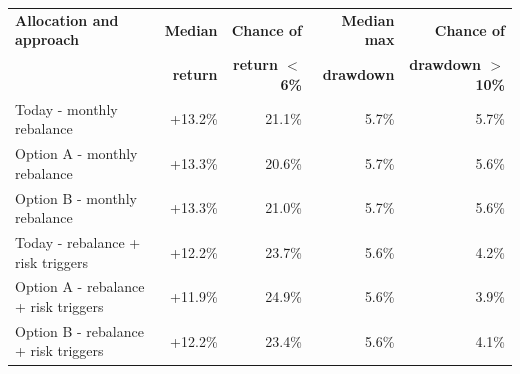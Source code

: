 \begin{tabular}{@{}lrrrr@{}}
\toprule
\textbf{Allocation and approach} & \textbf{Median} & \textbf{Chance of} & \textbf{Median max} & \textbf{Chance of} \\
 & \textbf{return} & \textbf{return $<$ 6\%} & \textbf{drawdown} & \textbf{drawdown $>$ 10\%} \\
\midrule
Today - monthly rebalance & +13.2\% & 21.1\% & \textminus{}5.7\% & 5.7\% \\
Option A - monthly rebalance & +13.3\% & 20.6\% & \textminus{}5.7\% & 5.6\% \\
Option B - monthly rebalance & +13.3\% & 21.0\% & \textminus{}5.7\% & 5.6\% \\
Today - rebalance + risk triggers & +12.2\% & 23.7\% & \textminus{}5.6\% & 4.2\% \\
Option A - rebalance + risk triggers & +11.9\% & 24.9\% & \textminus{}5.6\% & 3.9\% \\
Option B - rebalance + risk triggers & +12.2\% & 23.4\% & \textminus{}5.6\% & 4.1\% \\
\bottomrule
\end{tabular}